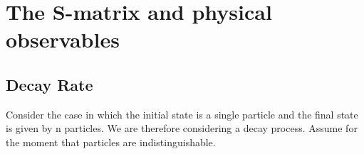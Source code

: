 \documentclass[TheoreticalPhy_ModB.tex]{subfiles}
\begin{document}
\chapter{The S-matrix and physical observables}

\section{Decay Rate}
Consider the case in which the initial state is a single particle and the final state is given by n particles. We are therefore considering a decay process. Assume for the moment that particles are indistinguishable.

\begin{center}
\begin{tikzpicture}[x=0.75pt,y=0.75pt,yscale=-1,xscale=1]


\end{tikzpicture}
\end{center}
\end{document}
